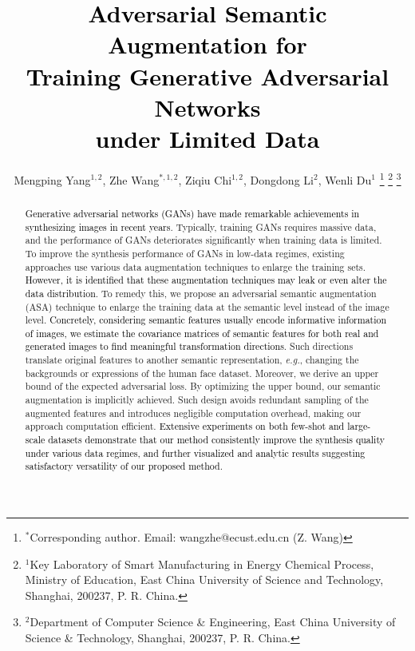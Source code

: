 \documentclass[10pt,journal,compsoc]{IEEEtran}
\newcommand{\revise}[1]{\textcolor{black}{#1}}
\begin{document}
\title{\revise{Adversarial Semantic Augmentation 
for \\ Training Generative Adversarial Networks \\
under Limited Data}}

\author
{Mengping Yang$^{1,2}$, Zhe Wang$^{*,1,2}$, Ziqiu Chi$^{1,2}$, Dongdong Li$^{2}$, Wenli Du$^{1}$
\thanks{$^*$Corresponding author. Email:
        wangzhe@ecust.edu.cn (Z. Wang)
        }
\thanks{$^1$Key Laboratory of Smart Manufacturing in Energy Chemical Process, Ministry of Education, East China University of Science and Technology, Shanghai, 200237, P. R. China.
        }
\thanks{$^2$Department of Computer Science \& Engineering, East China University of Science \& Technology, Shanghai, 200237, P. R. China.
}
}

\maketitle

%
\begin{abstract}
   \revise{Generative adversarial networks (GANs) have made remarkable achievements in synthesizing images in recent years}.
   Typically, training GANs requires massive data, and the performance of GANs deteriorates significantly when training data is limited. 
   To improve the synthesis performance of GANs in low-data regimes, existing approaches use various data augmentation techniques to enlarge the training sets.
   \revise{However, it is identified that these augmentation techniques may leak or even alter the data distribution}.
   To remedy this, we propose an adversarial semantic augmentation (ASA) technique to enlarge the training data at the semantic level instead of the image level.
   \revise{Concretely, considering semantic features usually encode informative information of images, we estimate the covariance matrices of semantic features for both real and generated images to find meaningful transformation directions}. 
   Such directions translate original features to another semantic representation, \emph{e.g.}, changing the backgrounds or expressions of the human face dataset.
   Moreover, we derive an upper bound of the expected adversarial loss. By optimizing the upper bound, our semantic augmentation is implicitly achieved.
   Such design avoids redundant sampling of the augmented features and introduces negligible computation overhead, making our approach computation efficient.
   \revise{Extensive experiments on both few-shot and large-scale datasets demonstrate that our method consistently improve the synthesis quality under various data regimes, and further visualized and analytic results suggesting satisfactory versatility of our proposed method}.
\end{abstract}
\end{document}
